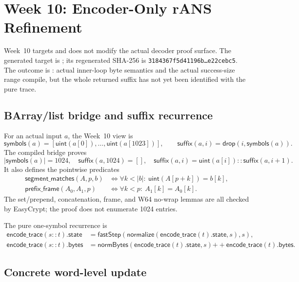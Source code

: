 \section{Week 10: Encoder-Only rANS Refinement}

Week~10 targets  and does not modify the
actual decoder proof surface.  The generated target is
; its regenerated SHA-256 is
\texttt{3184367f5d41196b\ldots e22cebc5}.  The outcome is
: actual inner-loop byte semantics and the actual
success-size range compile, but the whole returned suffix has not yet been
identified with the pure trace.

\subsection*{BArray/list bridge and suffix recurrence}

For an actual  input $a$, the Week~10 view is
\[
  \mathsf{symbols}(a)
    = [\mathsf{uint}(a[0]),\ldots,\mathsf{uint}(a[1023])],
  \qquad
  \mathsf{suffix}(a,i)=\mathsf{drop}(i,\mathsf{symbols}(a)).
\]
The compiled bridge proves
\[
  |\mathsf{symbols}(a)|=1024,
  \quad \mathsf{suffix}(a,1024)=[],
  \quad \mathsf{suffix}(a,i)=\mathsf{uint}(a[i])::
    \mathsf{suffix}(a,i+1).
\]
It also defines the pointwise predicates
\begin{align*}
 \mathsf{segment\_matches}(A,p,b)
 &\Longleftrightarrow
   \forall k<|b|:\ \mathsf{uint}(A[p+k])=b[k],\\
 \mathsf{prefix\_frame}(A_0,A_1,p)
 &\Longleftrightarrow
   \forall k<p:\ A_1[k]=A_0[k].
\end{align*}
The set/prepend, concatenation, frame, and W64 no-wrap lemmas are all checked
by EasyCrypt; the proof does not enumerate 1024 entries.

The pure one-symbol recurrence is
\begin{align*}
 \mathsf{encode\_trace}(s::t).\mathsf{state}
   &=\mathsf{fastStep}(\mathsf{normalize}(
       \mathsf{encode\_trace}(t).\mathsf{state},s),s),\\
 \mathsf{encode\_trace}(s::t).\mathsf{bytes}
   &=\mathsf{normBytes}(
       \mathsf{encode\_trace}(t).\mathsf{state},s)
       \mathbin{++}\mathsf{encode\_trace}(t).\mathsf{bytes}.
\end{align*}

\subsection*{Concrete word-level update}

